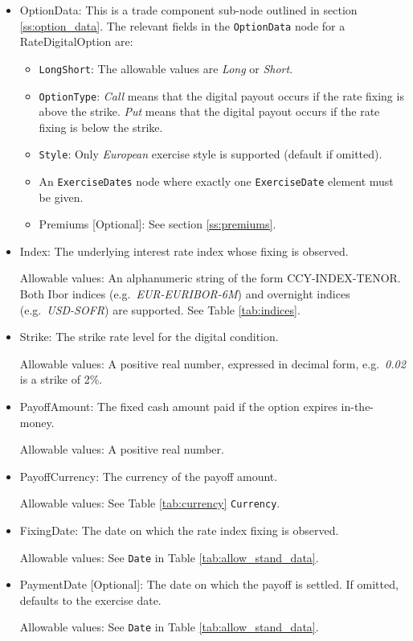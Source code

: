 \begin{itemize}

\item OptionData: This is a trade component sub-node outlined in section \ref{ss:option_data}.
The relevant fields in the \lstinline!OptionData! node for a RateDigitalOption are:

\begin{itemize}
\item \lstinline!LongShort!: The allowable values are \emph{Long} or \emph{Short}.

\item \lstinline!OptionType!: \emph{Call} means that the digital payout occurs if the rate fixing is above the strike.
  \emph{Put} means that the digital payout occurs if the rate fixing is below the strike.

\item \lstinline!Style!: Only \emph{European} exercise style is supported (default if omitted).

\item An \lstinline!ExerciseDates! node where exactly one \lstinline!ExerciseDate! element must be given.

\item Premiums [Optional]: See section \ref{ss:premiums}.
\end{itemize}

\item Index: The underlying interest rate index whose fixing is observed.

  Allowable values: An alphanumeric string of the form CCY-INDEX-TENOR. Both Ibor indices (e.g.\ \emph{EUR-EURIBOR-6M})
  and overnight indices (e.g.\ \emph{USD-SOFR}) are supported. See Table \ref{tab:indices}.

\item Strike: The strike rate level for the digital condition.

  Allowable values: A positive real number, expressed in decimal form, e.g.\ \emph{0.02} is a strike of 2\%.

\item PayoffAmount: The fixed cash amount paid if the option expires in-the-money.

  Allowable values: A positive real number.

\item PayoffCurrency: The currency of the payoff amount.

  Allowable values: See Table \ref{tab:currency} \lstinline!Currency!.

\item FixingDate: The date on which the rate index fixing is observed.

  Allowable values: See \lstinline!Date! in Table \ref{tab:allow_stand_data}.

\item PaymentDate [Optional]: The date on which the payoff is settled. If omitted, defaults to the exercise date.

  Allowable values: See \lstinline!Date! in Table \ref{tab:allow_stand_data}.

\end{itemize}
